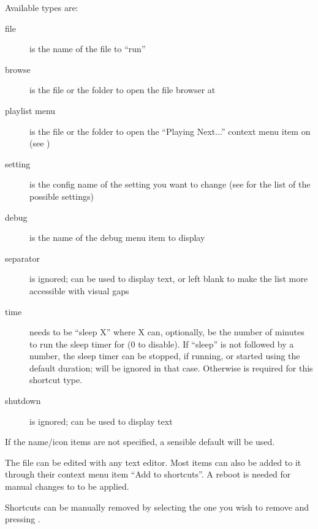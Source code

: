 Available types are:
\begin{description}
\item[file]  is the name of the file to ``run''
\item[browse]  is the file or the folder to open the file browser at
\item[playlist menu]  is the file or the folder to open the
  ``Playing Next...'' context menu item on (see )
\item[setting]  is the config name of the setting you want to change
  (see  for the list of the possible settings)
\item[debug]  is the name of the debug menu item to display
\item[separator]  is ignored;  can be used to display text,
  or left blank to make the list more accessible with visual gaps
\item[time]  needs to be ``sleep X''
  where X can, optionally, be the number of minutes to run the sleep timer for (0 to disable).
  If ``sleep'' is not followed by a number, the sleep timer can be stopped, if running,
  or started using the default duration;  will be ignored in that case. Otherwise
   is required for this shortcut type.
\item[shutdown]  is ignored;  can be used to display text
\end{description}

If the name/icon items are not specified, a sensible default will be used.


The file  can be edited with any text editor. Most items can
also be added to it through their context menu item ``Add to shortcuts''.
A reboot is needed for manual changes to  to be applied.

Shortcuts can be manually removed by selecting the one you wish to remove and pressing
\ActionStdContext{}.
